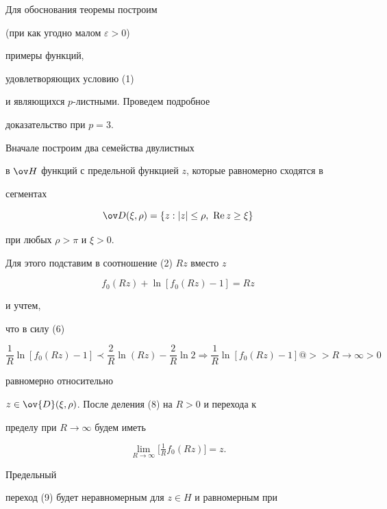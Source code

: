  


\begin{pf} Для обоснования теоремы построим 


(при как угодно малом $\varepsilon>0$) 


примеры функций, 


удовлетворяющих условию (1) 


и являющихся $p$-листными. Проведем подробное 


доказательство при $p=3$. 


 


Вначале построим два семейства двулистных 


в $\ov H$ функций с предельной функцией $z$, которые равномерно сходятся в 


сегментах 


$$ 


\ov D(\xi,\rho)=\{z:|z|\le\rho,\ \re z\ge \xi\} 


$$ 


при любых $\rho>\pi$ и $\xi >0$. 


Для этого подставим в соотношение (2) $Rz$ вместо $z$ 


\begin{equation} 


f_0(Rz)+\ln[f_0(Rz)-1]=Rz 


\end{equation} 


и учтем, 


что в силу (6) 


$$ 


\frac{1}{R}\ln[f_0(Rz)-1]\prec \frac{2}{R}\ln(Rz)- 


\frac{2}{R}\ln 2\Longrightarrow \frac{1}{R} 


\ln[f_0(Rz)-1]@>>{R\to\infty}> 0 


$$ 


равномерно относительно 


$z\in \ov{D}(\xi,\rho)$. После деления (8) на $R>0$ и перехода к 


пределу при $R\to \infty$ будем иметь 


\begin{equation} 


\lim_{R\to\infty}\big[\tfrac{1}{R}f_0(Rz)]=z. 


\end{equation} 


Предельный 


переход (9) будет неравномерным для $z\in H$ и равномерным при 



\end{pf}
